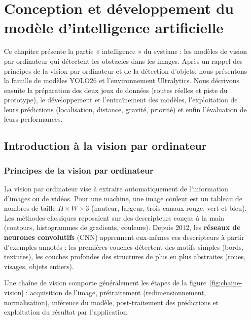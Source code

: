 \chapter{Conception et développement du modèle d'intelligence artificielle}

\chapintro
Ce chapitre présente la partie « intelligence » du système : les modèles de vision par ordinateur qui détectent les
obstacles dans les images. Après un rappel des principes de la vision par ordinateur et de la détection d'objets,
nous présentons la famille de modèles YOLO26 et l'environnement Ultralytics. Nous décrivons ensuite la
préparation des deux jeux de données (routes réelles et piste du prototype), le développement et l'entraînement
des modèles, l'exploitation de leurs prédictions (localisation, distance, gravité, priorité) et enfin
l'évaluation de leurs performances.

\section{Introduction à la vision par ordinateur}

\subsection{Principes de la vision par ordinateur}
La vision par ordinateur vise à extraire automatiquement de l'information d'images ou de vidéos. Pour une machine,
une image couleur est un tableau de nombres de taille $H \times W \times 3$ (hauteur, largeur, trois canaux rouge,
vert et bleu). Les méthodes classiques reposaient sur des descripteurs conçus à la main (contours, histogrammes de
gradients, couleurs). Depuis 2012, les \textbf{réseaux de neurones convolutifs} (CNN) apprennent eux-mêmes ces
descripteurs à partir d'exemples annotés : les premières couches détectent des motifs simples (bords, textures), les
couches profondes des structures de plus en plus abstraites (roues, visages, objets entiers).

Une chaîne de vision comporte généralement les étapes de la figure~\ref{fig:chaine-vision} : acquisition de
l'image, prétraitement (redimensionnement, normalisation), inférence du modèle, post-traitement des prédictions et
exploitation du résultat par l'application.

